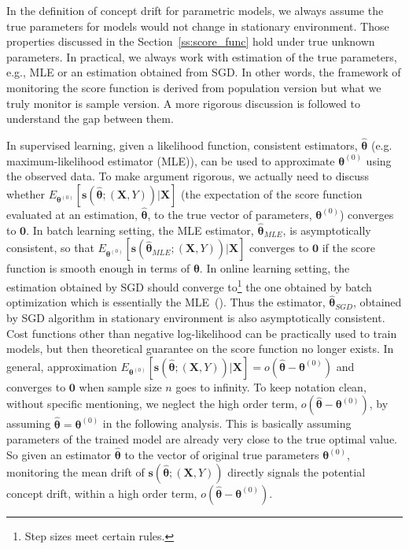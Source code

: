 \documentclass[twoside,11pt]{article}
\begin{document}
In the definition of concept drift for parametric models, we always assume the true parameters for models would not change in stationary environment. Those properties discussed in the Section~\ref{ss:score_func} hold under true unknown parameters. In practical, we always work with estimation of the true parameters, e.g., MLE or an estimation obtained from SGD. In other words, the framework of monitoring the score function is derived from population version but what we truly monitor is sample version. A more rigorous discussion is followed to understand the gap between them.

In supervised learning, given a likelihood function, consistent estimators, $\hat {\bm {\theta}}$ (e.g. maximum-likelihood estimator (MLE)), can be used to approximate {$\bm { \theta}^{ (0)}$} using the observed data. To make argument rigorous, we actually need to discuss whether $E_{\bm { \theta} ^{ (0)}}[\bm{s}(\hat{\bm { \theta}};(\bm {X}, Y))|\bm {X}]$ (the expectation of the score function evaluated at an estimation, $\hat { \bm { \theta}}$, to the true vector of parameters, $\bm { \theta} ^{ (0)}$) converges to $\bm {0}$. In batch learning setting, the MLE estimator, $\hat { \bm { \theta}}_ {MLE}$, is asymptotically consistent, so that $E_{\bm { \theta} ^{ (0)}}[\bm{s}(\hat{\bm { \theta}} _{MLE};(\bm {X}, Y))|\bm {X}]$ converges to $\bm {0}$ if the score function is smooth enough in terms of $\bm { \theta}$. In online learning setting, the estimation obtained by SGD should converge to\footnote{Step sizes meet certain rules.} the one obtained by batch optimization which is essentially the MLE~(\cite{bottou2018optimization}). Thus the estimator, $\hat {\bm { \theta}} _{SGD} $, obtained by SGD algorithm in stationary environment is also asymptotically consistent. Cost functions other than negative log-likelihood can be practically used to train models, but then theoretical guarantee on the score function no longer exists. In general, approximation {$E _{\bm { \theta} ^{ (0)}}[\bm{s}(\hat{\bm { \theta}};(\bm {X}, Y))|\bm{X}] = o (\hat{\bm { \theta}} - \bm { \theta}^{ (0)}) $} and converges to $\bm {0}$ when sample size $n$ goes to infinity.  To {keep notation clean}, without specific mentioning, we neglect the high order term, $o(\hat{\bm { \theta}} - \bm { \theta} ^{ (0)})$, by assuming {$\hat {\bm { \theta}} = \bm { \theta}^{ (0)}$} in the following analysis. This is basically assuming parameters of the trained model are already very close to the true optimal value. So given an estimator $\hat {\bm { \theta}}$ to the vector of original true parameters $\bm { \theta}^{(0)}$, monitoring the mean {drift} of $\bm{s} (\hat{\bm { \theta}};(\bm {X}, Y))$ directly signals the potential concept drift, within a high order term, {$o(\hat{\bm { \theta}} - \bm { \theta} ^{ (0)})$.}
\end{document}
